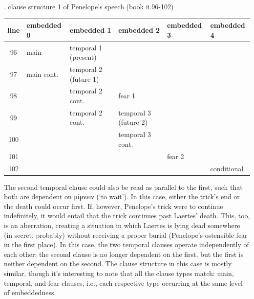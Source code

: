 \documentclass[12pt]{article}
\begin{document}
\begin{singlespacing}
\ex. clause structure 1 of Penelope's speech (book ii.96-102)

\begin{footnotesize}

\begin{tabularx}{\textwidth}{
|c
|>{\centering\arraybackslash}X
|>{\centering\arraybackslash}X
|>{\centering\arraybackslash}X
|>{\centering\arraybackslash}X
|>{\centering\arraybackslash}X
|
}
\hline
line & embedded 0 & embedded 1 & embedded 2 & embedded 3 & embedded 4 \\
\hline \hline
96 & main & temporal 1 (present) & & & \\
\hline
97 & main cont. & temporal 2 (future 1) & & & \\
\hline
98 & & temporal 2 cont. & fear 1 & & \\
\hline
99 & & temporal 2 cont. & temporal 3 (future 2) & & \\
\hline
100 & & & temporal 3 cont. & & \\
\hline
101 & & & & fear 2 & \\
\hline
102 & & & & & conditional \\
\hline

\end{tabularx}
\end{footnotesize}
\end{singlespacing}

The second temporal clause could also be read as parallel to the first, such that both are dependent on μίμνειν (`to wait'). In this case, either the trick's end or the death could occur first. If, however, Penelope's trick were to continue indefinitely, it would entail that the trick continues past Laertes' death. This, too, is an aberration, creating a situation in which Laertes is lying dead somewhere (in secret, probably) without receiving a proper burial (Penelope's ostensible fear in the first place). In this case, the two temporal clauses operate independently of each other; the second clause is no longer dependent on the first, but the first is neither dependent on the second. The clause structure in this case is mostly similar, though it's interesting to note that all the clause types match: main, temporal, and fear clauses, i.e., each respective type occurring at the same level of embeddedness.
\end{document}
